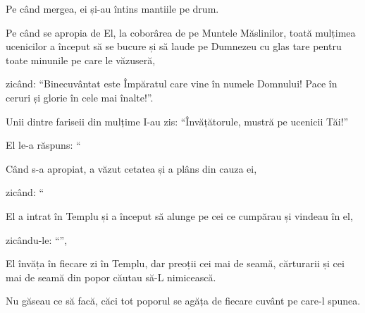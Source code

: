 {Pe când mergea, ei și-au întins mantiile pe drum.


\par }{\PP {}Pe când se apropia de El, la coborârea de pe Muntele Măslinilor, toată mulțimea ucenicilor a început să se bucure și să laude pe Dumnezeu cu glas tare pentru toate minunile pe care le văzuseră,

zicând: “Binecuvântat este Împăratul care vine în numele Domnului! Pace în ceruri și glorie în cele mai înalte!”.


\par }{\PP {}Unii dintre fariseii din mulțime I-au zis: “Învățătorule, mustră pe ucenicii Tăi!”


\par }{\PP {}El le-a răspuns: “{}


\par }{\PP {}Când s-a apropiat, a văzut cetatea și a plâns din cauza ei,

zicând: “{}




\par }{\PP {}El a intrat în Templu și a început să alunge pe cei ce cumpărau și vindeau în el,

zicându-le: “{}”,
{}


\par }{\PP {}El învăța în fiecare zi în Templu, dar preoții cei mai de seamă, cărturarii și cei mai de seamă din popor căutau să-L nimicească.

Nu găseau ce să facă, căci tot poporul se agăța de fiecare cuvânt pe care-l spunea.



\par }
